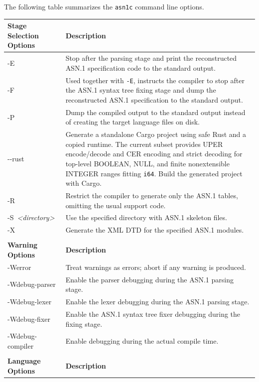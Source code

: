 \documentclass[english,oneside,12pt]{book}
\newcommand{\cmd}[1]{\texttt{#1}}
\begin{document}
The following table summarizes the \cmd{asn1c} command line options.

\renewcommand{\arraystretch}{1.33}
\begin{longtable}{lp{4in}}
\textbf{Stage Selection Options} & \textbf{Description}\\
\midrule
{\ttfamily -E} & {\small Stop after the parsing stage and print the reconstructed ASN.1
specification code to the standard output.}\\
{\ttfamily -F} & {\small Used together with \texttt{-E}, instructs the compiler to stop after
the ASN.1 syntax tree fixing stage and dump the reconstructed ASN.1
specification to the standard output.}\\
{\ttfamily -P} & {\small Dump the compiled output to the standard output instead of
creating the target language files on disk.}\\
{\ttfamily -{}-rust} & {\small Generate a standalone Cargo project using safe Rust and a copied
runtime. The current subset provides UPER encode/decode and CER encoding and strict decoding for
top-level BOOLEAN, NULL, and finite nonextensible INTEGER ranges fitting \texttt{i64}. Build the
generated project with Cargo.}\\
{\ttfamily -R} & {\small Restrict the compiler to generate only the ASN.1 tables, omitting the usual support code.}\\
{\ttfamily -S~\emph{<directory>}} & {\small Use the specified directory with ASN.1 skeleton files.}\\
{\ttfamily -X} & {\small Generate the XML DTD for the specified ASN.1 modules.}\\\\
\textbf{Warning Options} & \textbf{Description}\\
\midrule
{\ttfamily -Werror} & {\small Treat warnings as errors; abort if any warning is produced.}\\
{\ttfamily -Wdebug-parser} & {\small Enable the parser debugging during the ASN.1 parsing stage.}\\
{\ttfamily -Wdebug-lexer} & {\small Enable the lexer debugging during the ASN.1 parsing stage.}\\
{\ttfamily -Wdebug-fixer} & {\small Enable the ASN.1 syntax tree fixer debugging during the fixing stage.}\\
{\ttfamily -Wdebug-compiler} & {\small Enable debugging during the actual compile time.}\\  \\
\textbf{Language Options} & \textbf{Description}\\

\end{longtable}
\end{document}
